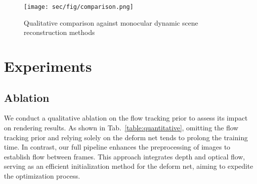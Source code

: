 \begin{figure}[t] 
	\begin{center} 
        \vspace{10pt}
		\texttt{[image: sec/fig/comparison.png]} 
	\end{center} 
    \vspace{-15pt}
    \caption{Qualitative comparison against monocular dynamic scene reconstruction methods}
	\label{fig:comparison} 
\end{figure} 

\section{Experiments}
\subsection{Ablation}
We conduct a qualitative ablation on the flow tracking prior to assess its impact on rendering results. As shown in Tab.~\ref{table:quantitative}, omitting the flow tracking prior and relying solely on the deform net tends to prolong the training time. In contrast, our full pipeline enhances the preprocessing of images to establish flow between frames. This approach integrates depth and optical flow, serving as an efficient initialization method for the deform net, aiming to expedite the optimization process.


